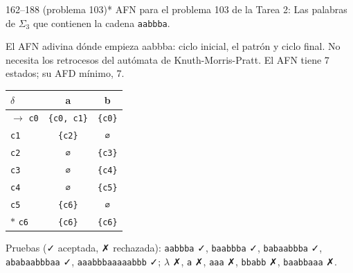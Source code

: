 \documentclass[11pt]{article}
\begin{document}
\begin{ejercicio}{162--188 (problema 103)}{*}
AFN para el problema 103 de la Tarea 2: Las palabras de $\Sigma_3$ que contienen la cadena \texttt{aabbba}.
\end{ejercicio}
\proc El AFN adivina dónde empieza aabbba: ciclo inicial, el patrón y ciclo final. No necesita los retrocesos del autómata de Knuth-Morris-Pratt. El AFN tiene 7 estados; su AFD mínimo, 7.
\begin{center}\small\begin{tabular}{lcc}\toprule
$\delta$ & a & b \\\midrule
$\to$ \texttt{c0} & \texttt{\{c0, c1\}} & \texttt{\{c0\}} \\
 \texttt{c1} & \texttt{\{c2\}} & \texttt{∅} \\
 \texttt{c2} & \texttt{∅} & \texttt{\{c3\}} \\
 \texttt{c3} & \texttt{∅} & \texttt{\{c4\}} \\
 \texttt{c4} & \texttt{∅} & \texttt{\{c5\}} \\
 \texttt{c5} & \texttt{\{c6\}} & \texttt{∅} \\
$*$ \texttt{c6} & \texttt{\{c6\}} & \texttt{\{c6\}} \\
\bottomrule\end{tabular}\end{center}
Pruebas (✓ aceptada, ✗ rechazada): \texttt{aabbba} ✓, \texttt{baabbba} ✓, \texttt{babaabbba} ✓, \texttt{ababaabbbaa} ✓, \texttt{aaabbbaaaaabbb} ✓; $\lambda$ ✗, \texttt{a} ✗, \texttt{aaa} ✗, \texttt{bbabb} ✗, \texttt{baabbaaa} ✗.
\end{document}
